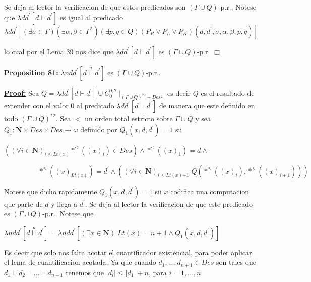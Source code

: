 Se deja al lector la verificacion de que estos predicados son \((\Gamma \cup Q)\)-p.r.. Notese que \(\lambda dd^{\prime }\left[ d\vdash d^{\prime }\right] \) es igual al predicado
\(\displaystyle \lambda dd^{\prime }\left[ (\exists \sigma \in \Gamma )(\exists \alpha ,\beta \in \Gamma ^{\ast })(\exists p,q\in Q)(P_{R}\vee P_{L}\vee P_{K})(d,d^{\prime },\sigma ,\alpha ,\beta ,p,q)\right] \)

lo cual por el Lema 39 nos dice que \(\lambda dd^{\prime } \left[ d\vdash d^{\prime }\right] \) es \((\Gamma \cup Q)\)-p.r. \(\Box\)


\textbf{\underline{Proposition 81:}} \(\lambda ndd^{\prime }\left[ d\overset{n}{\vdash }d^{\prime }\right] \) es \( (\Gamma \cup Q)\)-p.r..

\textbf{\underline{Proof:}} Sea \(Q=\lambda dd^{\prime }\left[ d\vdash d^{\prime }\right] \cup C_{0}^{0,2}\mid _{(\Gamma \cup Q)^{\ast 2}-Des^{2}}\) es decir \(Q\) es el resultado de extender con el valor \(0\) al predicado \(\lambda dd^{\prime } \left[ d\vdash d^{\prime }\right] \) de manera que este definido en todo \( (\Gamma \cup Q)^{\ast 2}\). Sea \(< \) un orden total estricto sobre \(\Gamma \cup Q\) y sea \(Q_{1}:\mathbf{N}\times Des\times Des\rightarrow \omega \) definido por \(Q_{1}(x,d,d^{\prime })=1\) sii

\(\left( (\forall i\in \mathbf{N})_{i\leq Lt(x)}\ast ^{< }((x)_{i})\in Des\right) \wedge \ast ^{< }((x)_{1})=d\wedge \)

\(\ \ \ \ \ \ \ \ \ \ \ \ \ \ \ \ \ \ \ \ \ \ \ast ^{< }((x)_{Lt(x)})=d^{\prime }\wedge \left( (\forall i\in \mathbf{N})_{i\leq Lt(x)\dot{-}1}\;Q(\ast ^{< }((x)_{i}),\ast ^{< }((x)_{i+1}))\right) \)

Notese que dicho rapidamente \(Q_{1}(x,d,d^{\prime })=1\) sii \(x\) codifica una computacion que parte de \(d\) y llega a \(d^{\prime }\). Se deja al lector la verificacion de que este predicado es \((\Gamma \cup Q)\)-p.r.. Notese que

\(\displaystyle \lambda ndd^{\prime }\left[ d\overset{n}{\vdash }d^{\prime }\right] =\lambda ndd^{\prime }\left[ \left( \exists x\in \mathbf{N}\right) \;Lt(x)=n+1\wedge Q_{1}(x,d,d^{\prime })\right] \)

Es decir que solo nos falta acotar el cuantificador existencial, para poder aplicar el lema de cuantificacion acotada. Ya que cuando \( d_{1},...,d_{n+1}\in Des\) son tales que \(d_{1}\vdash d_{2}\vdash ...\vdash d_{n+1}\) tenemos que
\(\displaystyle \left\vert d_{i}\right\vert \leq \left\vert d_{1}\right\vert +n\text{, para } i=1,...,n \)

